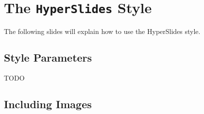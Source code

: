 \documentclass[11pt,a4paper,landscape]{article}
\begin{document}
\NewPage\section{The \texttt{HyperSlides} Style}
\secttoc
\vfill
The following slides will explain how to use the HyperSlides style.
\vfill

\NewPage\subsection{Style Parameters}
\vfill
TODO
\vfill

\NewPage\subsection{Including Images}
\end{document}
